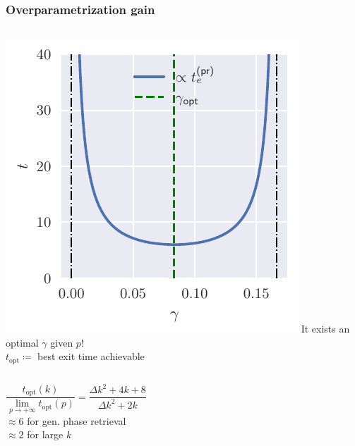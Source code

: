 \documentclass{beamer}
\begin{document}
\begin{frame}
  \frametitle{Overparametrization gain}
  \begin{columns}
      \hspace{-7pt}
      \includegraphics[width=1.\textwidth]{figures/spherical/gamma_te-factor.pdf}
      \hfill It exists an optimal \(\gamma\) given \(p\)!\\
      \vspace{5pt}
      \hfill \(t_\text{opt} \coloneqq\) best exit time achievable
  \end{columns}
  \begin{columns}
      \[
        \frac{t_\text{opt}{(k)}}{\lim_{p\to+\infty}t_\text{opt}{(p)}} =
        \frac{\Delta k^2 + 4k + 8}{\Delta k^2 + 2k}
      \]
      \(\approx 6\) for gen. phase retrieval\\
      \(\approx 2\) for large \(k\)
  \end{columns}
\end{frame}
\end{document}
